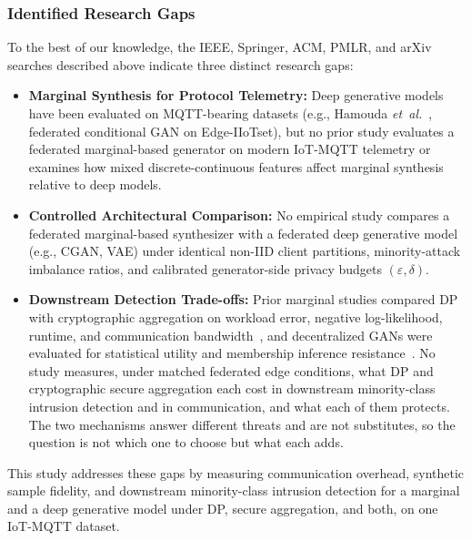 \subsubsection*{Identified Research Gaps}
To the best of our knowledge, the IEEE, Springer, ACM, PMLR, and arXiv searches described above indicate three distinct research gaps:
\begin{itemize}
    \item \textbf{Marginal Synthesis for Protocol Telemetry:} Deep generative models have been evaluated on MQTT-bearing datasets (e.g., Hamouda \textit{et~al.}~\cite{hamouda2024}, federated conditional GAN on Edge-IIoTset), but no prior study evaluates a federated marginal-based generator on modern IoT-MQTT telemetry or examines how mixed discrete-continuous features affect marginal synthesis relative to deep models.
    \item \textbf{Controlled Architectural Comparison:} No empirical study compares a federated marginal-based synthesizer with a federated deep generative model (e.g., CGAN, VAE) under identical non-IID client partitions, minority-attack imbalance ratios, and calibrated generator-side privacy budgets $(\varepsilon, \delta)$.
    \item \textbf{Downstream Detection Trade-offs:} Prior marginal studies compared DP with cryptographic aggregation on workload error, negative log-likelihood, runtime, and communication bandwidth~\cite{maddock2024, pentyala2024}, and decentralized GANs were evaluated for statistical utility and membership inference resistance~\cite{duan2023}. No study measures, under matched federated edge conditions, what DP and cryptographic secure aggregation each cost in downstream minority-class intrusion detection and in communication, and what each of them protects. The two mechanisms answer different threats and are not substitutes, so the question is not which one to choose but what each adds.
\end{itemize}

This study addresses these gaps by measuring communication overhead, synthetic sample fidelity, and downstream minority-class intrusion detection for a marginal and a deep generative model under DP, secure aggregation, and both, on one IoT-MQTT dataset.

\clearpage
